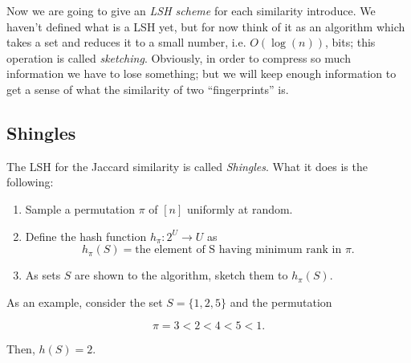 Now we are going to give an \emph{LSH scheme} for each similarity introduce. We haven't defined what is a LSH yet, but for now think of it as an algorithm which takes a set and reduces it to a small number, i.e. $O(\log(n))$, bits; this operation is called \emph{sketching}. Obviously, in order to compress so much information we have to lose something; but we will keep enough information to get a sense of what the similarity of two ``fingerprints'' is.

\subsection{Shingles}
The LSH for the Jaccard similarity is called \emph{Shingles}. What it does is the following:

\begin{enumerate}
	\item Sample a permutation $\pi$ of $[n]$ uniformly at random.
	\item Define the hash function $h_\pi : 2^U \rightarrow U$ as
	\begin{equation}
	h_\pi(S) = \text{the element of S having minimum rank in } \pi.
	\end{equation}
	\item As sets $S$ are shown to the algorithm, sketch them to $h_\pi(S)$.
\end{enumerate}

As an example, consider the set $S = \{1, 2, 5\}$ and the permutation 

$$\pi = 3 < 2 < 4 < 5 < 1.$$

Then, $h(S) = 2$.
